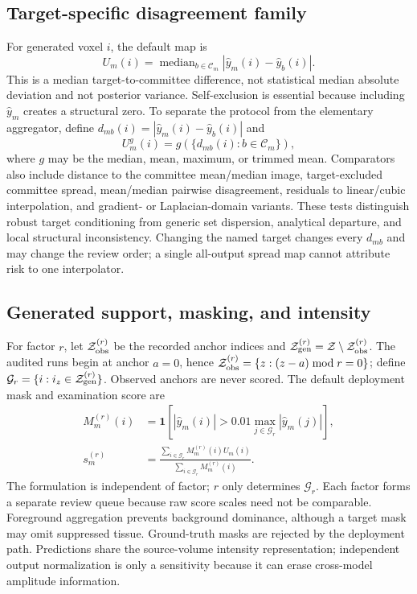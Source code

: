 \documentclass{article}
\begin{document}
\subsection{Target-specific disagreement family}
For generated voxel $i$, the default map is
\begin{equation}
 U_m(i)=\mathop{\mathrm{median}}_{b\in\mathcal C_m}
 |\hat y_m(i)-\hat y_b(i)|.
 \label{eq:score}
\end{equation}
This is a median target-to-committee difference, not statistical median absolute deviation and not posterior variance. Self-exclusion is essential because including $\hat y_m$ creates a structural zero. To separate the protocol from the elementary aggregator, define $d_{mb}(i)=|\hat y_m(i)-\hat y_b(i)|$ and
\begin{equation}
 U_m^g(i)=g\!\left(\{d_{mb}(i):b\in\mathcal C_m\}\right),
 \label{eq:family}
\end{equation}
where $g$ may be the median, mean, maximum, or trimmed mean. Comparators also include distance to the committee mean/median image, target-excluded committee spread, mean/median pairwise disagreement, residuals to linear/cubic interpolation, and gradient- or Laplacian-domain variants. These tests distinguish robust target conditioning from generic set dispersion, analytical departure, and local structural inconsistency. Changing the named target changes every $d_{mb}$ and may change the review order; a single all-output spread map cannot attribute risk to one interpolator.

\subsection{Generated support, masking, and intensity}
For factor $r$, let $\mathcal Z_{\rm obs}^{(r)}$ be the recorded anchor indices and $\mathcal Z_{\rm gen}^{(r)}=\mathcal Z\setminus\mathcal Z_{\rm obs}^{(r)}$. The audited runs begin at anchor $a=0$, hence $\mathcal Z_{\rm obs}^{(r)}=\{z:(z-a)\bmod r=0\}$; define $\mathcal G_r=\{i:i_z\in\mathcal Z_{\rm gen}^{(r)}\}$. Observed anchors are never scored. The default deployment mask and examination score are
\begin{align}
 M_m^{(r)}(i)&=\mathbf1\!\left[|\hat y_m(i)|>0.01\max_{j\in\mathcal G_r}|\hat y_m(j)|\right],\label{eq:mask}\\
 s_m^{(r)}&=\frac{\sum_{i\in\mathcal G_r}M_m^{(r)}(i)U_m(i)}{\sum_{i\in\mathcal G_r}M_m^{(r)}(i)}.
 \label{eq:case}
\end{align}
The formulation is independent of factor; $r$ only determines $\mathcal G_r$. Each factor forms a separate review queue because raw score scales need not be comparable. Foreground aggregation prevents background dominance, although a target mask may omit suppressed tissue. Ground-truth masks are rejected by the deployment path. Predictions share the source-volume intensity representation; independent output normalization is only a sensitivity because it can erase cross-model amplitude information.
\end{document}
